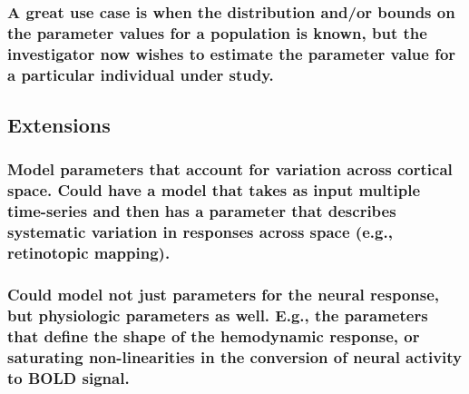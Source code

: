 \documentclass[
  man,floatsintext]{apa6}
\begin{document}
\hypertarget{a-great-use-case-is-when-the-distribution-andor-bounds-on-the-parameter-values-for-a-population-is-known-but-the-investigator-now-wishes-to-estimate-the-parameter-value-for-a-particular-individual-under-study.}{%
\subsubsection{A great use case is when the distribution and/or bounds on the parameter values for a population is known, but the investigator now wishes to estimate the parameter value for a particular individual under study.}\label{a-great-use-case-is-when-the-distribution-andor-bounds-on-the-parameter-values-for-a-population-is-known-but-the-investigator-now-wishes-to-estimate-the-parameter-value-for-a-particular-individual-under-study.}}

\hypertarget{extensions}{%
\subsection{Extensions}\label{extensions}}

\hypertarget{model-parameters-that-account-for-variation-across-cortical-space.-could-have-a-model-that-takes-as-input-multiple-time-series-and-then-has-a-parameter-that-describes-systematic-variation-in-responses-across-space-e.g.-retinotopic-mapping.}{%
\subsubsection{Model parameters that account for variation across cortical space. Could have a model that takes as input multiple time-series and then has a parameter that describes systematic variation in responses across space (e.g., retinotopic mapping).}\label{model-parameters-that-account-for-variation-across-cortical-space.-could-have-a-model-that-takes-as-input-multiple-time-series-and-then-has-a-parameter-that-describes-systematic-variation-in-responses-across-space-e.g.-retinotopic-mapping.}}

\hypertarget{could-model-not-just-parameters-for-the-neural-response-but-physiologic-parameters-as-well.-e.g.-the-parameters-that-define-the-shape-of-the-hemodynamic-response-or-saturating-non-linearities-in-the-conversion-of-neural-activity-to-bold-signal.}{%
\subsubsection{Could model not just parameters for the neural response, but physiologic parameters as well. E.g., the parameters that define the shape of the hemodynamic response, or saturating non-linearities in the conversion of neural activity to BOLD signal.}\label{could-model-not-just-parameters-for-the-neural-response-but-physiologic-parameters-as-well.-e.g.-the-parameters-that-define-the-shape-of-the-hemodynamic-response-or-saturating-non-linearities-in-the-conversion-of-neural-activity-to-bold-signal.}}
\end{document}
